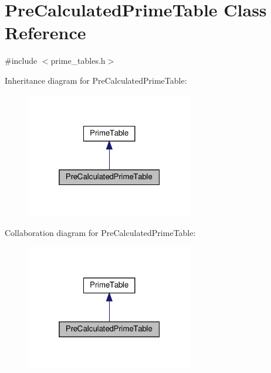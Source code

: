 \hypertarget{classPreCalculatedPrimeTable}{}\section{Pre\+Calculated\+Prime\+Table Class Reference}
\label{classPreCalculatedPrimeTable}


{\ttfamily \#include $<$prime\+\_\+tables.\+h$>$}



Inheritance diagram for Pre\+Calculated\+Prime\+Table\+:\nopagebreak
\begin{figure}[H]
\begin{center}
\leavevmode
\includegraphics[width=208pt]{classPreCalculatedPrimeTable__inherit__graph}
\end{center}
\end{figure}


Collaboration diagram for Pre\+Calculated\+Prime\+Table\+:\nopagebreak
\begin{figure}[H]
\begin{center}
\leavevmode
\includegraphics[width=208pt]{classPreCalculatedPrimeTable__coll__graph}
\end{center}
\end{figure}
